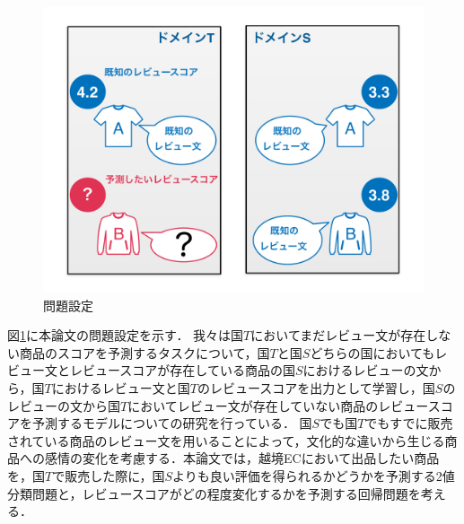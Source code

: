 \documentclass[dvipdfmx,twocolumn,10.5pt]{jsarticle}
\begin{document}
\begin{figure}[tb]
	\centering
	\includegraphics[width=\linewidth]{images/problem_setting.pdf} 
	\caption{問題設定}
	\label{problem_setting}
\end{figure}

図\ref{problem_setting}に本論文の問題設定を示す．
我々は国$T$においてまだレビュー文が存在しない商品のスコアを予測するタスクについて，国$T$と国$S$どちらの国においてもレビュー文とレビュースコアが存在している商品の国$S$におけるレビューの文から，国$T$におけるレビュー文と国$T$のレビュースコアを出力として学習し，国$S$のレビューの文から国$T$においてレビュー文が存在していない商品のレビュースコアを予測するモデルについての研究を行っている．
国$S$でも国$T$でもすでに販売されている商品のレビュー文を用いることによって，文化的な違いから生じる商品への感情の変化を考慮する．本論文では，越境ECにおいて出品したい商品を，国$T$で販売した際に，国$S$よりも良い評価を得られるかどうかを予測する2値分類問題と，レビュースコアがどの程度変化するかを予測する回帰問題を考える．
\end{document}
